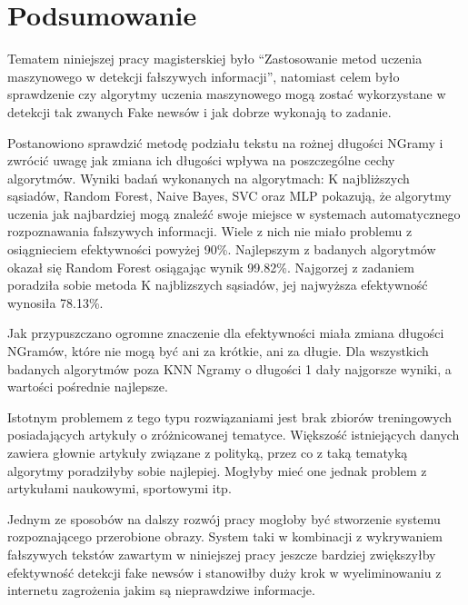 \chapter{Podsumowanie}
Tematem niniejszej pracy magisterskiej było 
``Zastosowanie metod uczenia maszynowego w detekcji fałszywych informacji'',
natomiast celem było sprawdzenie czy algorytmy uczenia maszynowego mogą zostać wykorzystane
w detekcji tak zwanych Fake newsów i jak dobrze wykonają to zadanie.


Postanowiono sprawdzić metodę podziału tekstu na rożnej długości NGramy i zwrócić uwagę 
jak zmiana ich długości wpływa na poszczególne cechy algorytmów.
Wyniki badań wykonanych na algorytmach: K najbliższych sąsiadów, Random Forest, Naive Bayes,
SVC oraz MLP pokazują, że algorytmy uczenia jak najbardziej mogą znaleźć swoje miejsce w systemach
automatycznego rozpoznawania fałszywych informacji. Wiele z nich nie miało problemu z osiągnieciem 
efektywności powyżej 90\%. Najlepszym z badanych algorytmów okazał się Random Forest osiągając
wynik 99.82\%. Najgorzej z zadaniem poradziła sobie metoda K najblizszych sąsiadów, jej najwyższa 
efektywność wynosiła 78.13\%.

Jak przypuszczano ogromne znaczenie dla efektywności
miała zmiana długości NGramów, które nie mogą być ani za krótkie, ani za długie.
Dla wszystkich badanych algorytmów poza KNN Ngramy o długości 1 dały najgorsze wyniki, a wartości
pośrednie najlepsze.

Istotnym problemem z tego typu rozwiązaniami jest brak zbiorów treningowych posiadających 
artykuły o zróżnicowanej tematyce. Większość istniejących danych zawiera głownie artykuły związane z 
polityką, przez co z taką tematyką algorytmy poradziłyby sobie najlepiej. Mogłyby mieć one jednak problem 
z artykułami naukowymi, sportowymi itp.

Jednym ze sposobów na dalszy rozwój pracy mogłoby być stworzenie systemu rozpoznającego 
przerobione obrazy. System taki w kombinacji z wykrywaniem fałszywych tekstów zawartym
w niniejszej pracy jeszcze bardziej zwiększyłby efektywność detekcji fake newsów i stanowiłby 
duży krok w wyeliminowaniu z internetu zagrożenia jakim są nieprawdziwe informacje.